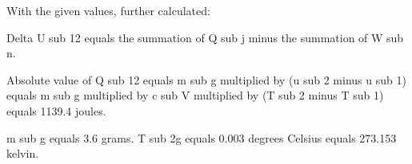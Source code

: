 With the given values, further calculated:  

Delta U sub 12 equals the summation of Q sub j minus the summation of W sub n.  

Absolute value of Q sub 12 equals m sub g multiplied by (u sub 2 minus u sub 1) equals m sub g multiplied by c sub V multiplied by (T sub 2 minus T sub 1) equals 1139.4 joules.  

m sub g equals 3.6 grams.  
T sub 2g equals 0.003 degrees Celsius equals 273.153 kelvin.